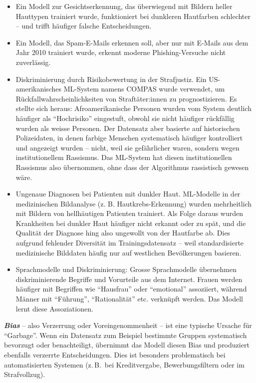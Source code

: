 \begin{lpu}
\begin{itemize}
  \item Ein Modell zur Gesichtserkennung, das überwiegend mit Bildern heller Hauttypen trainiert wurde, funktioniert bei dunkleren Hautfarben schlechter – und trifft häufiger falsche Entscheidungen.
  \item Ein Modell, das Spam-E-Mails erkennen soll, aber nur mit E-Mails aus dem Jahr 2010 trainiert wurde, erkennt moderne Phishing-Versuche nicht zuverlässig.
  \item Diskriminierung durch Risikobewertung in der Strafjustiz. Ein US-amerikanisches ML-System namens COMPAS wurde verwendet, um Rückfallwahrscheinlichkeiten von Straftäter:innen zu prognostizieren. Es stellte sich heraus: Afroamerikanische Personen wurden vom System deutlich häufiger als ``Hochrisiko'' eingestuft, obwohl sie nicht häufiger rückfällig wurden als weisse Personen. Der Datensatz aber basierte auf historischen Polizeidaten, in denen farbige Menschen systematisch häufiger kontrolliert und angezeigt wurden – nicht, weil sie gefährlicher waren, sondern wegen institutionellem Rassismus. Das ML-System hat diesen institutionellen Rassismus also übernommen, ohne dass der Algorithmus rassistisch gewesen wäre.
  \item{Ungenaue Diagnosen bei Patienten mit dunkler Haut}. ML-Modelle in der medizinischen Bildanalyse (z. B. Hautkrebs-Erkennung) wurden mehrheitlich mit Bildern von hellhäutigen Patienten trainiert. Als Folge daraus wurden Krankheiten bei dunkler Haut häufiger nicht erkannt oder zu spät, und die Qualität der Diagnose hing also ungewollt von der Hautfarbe ab. Dies aufgrund fehlender Diversität im Trainingsdatensatz – weil standardisierte medizinische Bilddaten häufig nur auf westlichen Bevölkerungen basieren.
  \item{Sprachmodelle und Diskriminierung}: Grosse Sprachmodelle übernehmen diskriminierende Begriffe und Vorurteile aus dem Internet. Frauen werden häufiger mit Begriffen wie ``Hausfrau'' oder ``emotional'' assoziiert, während Männer mit ``Führung'', ``Rationalität'' etc. verknüpft werden. Das Modell lernt diese Assoziationen. 
\end{itemize}

\begin{theorie}
\textbf{\textit{Bias}} – also Verzerrung oder Voreingenommenheit – ist eine typische Ursache für ``Garbage''. Wenn ein Datensatz zum Beispiel bestimmte Gruppen systematisch bevorzugt oder benachteiligt, übernimmt das Modell diesen Bias und produziert ebenfalls verzerrte Entscheidungen. Dies ist besonders problematisch bei automatisierten Systemen (z.\,B.\ bei Kreditvergabe, Bewerbungsfiltern oder im Strafvollzug).
\end{theorie}


\end{lpu}
